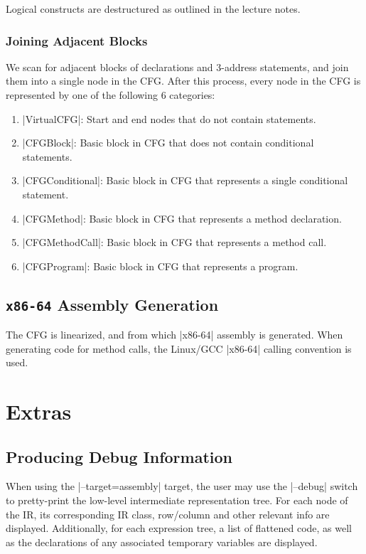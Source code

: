 Logical constructs are destructured as outlined in the lecture notes.

\subsubsection{Joining Adjacent Blocks}

We scan for adjacent blocks of declarations and 3-address statements, and join them into a single node in the CFG. After this process, every node in the CFG is represented by one of the following 6 categories:
\begin{enumerate}
    \item |VirtualCFG|: Start and end nodes that do not contain statements.
    \item |CFGBlock|: Basic block in CFG that does not contain conditional statements.
    \item |CFGConditional|: Basic block in CFG that represents a single conditional statement.
    \item |CFGMethod|: Basic block in CFG that represents a method declaration.
    \item |CFGMethodCall|: Basic block in CFG that represents a method call.
    \item |CFGProgram|: Basic block in CFG that represents a program.
\end{enumerate}

\subsection{\lstinline{x86-64} Assembly Generation}

The CFG is linearized, and from which |x86-64| assembly is generated. When generating code for method calls, the Linux/GCC |x86-64| calling convention is used.

\newpage

\section{Extras}

\subsection{Producing Debug Information}

When using the |--target=assembly| target, the user may use the |--debug| switch to pretty-print the low-level intermediate representation tree. For each node of the IR, its corresponding IR class, row/column and other relevant info are displayed. Additionally, for each expression tree, a list of flattened code, as well as the declarations of any associated temporary variables are displayed.

